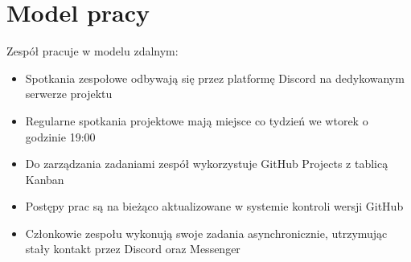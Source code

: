 \documentclass[12pt,a4paper,colorlinks=true,linkcolor=NavyBlue,citecolor=red,urlcolor=NavyBlue]{book}
\begin{document}
\section{Model pracy}
Zespół pracuje w modelu zdalnym:
\begin{itemize}
    \item Spotkania zespołowe odbywają się przez platformę Discord na dedykowanym serwerze projektu
    \item Regularne spotkania projektowe mają miejsce co tydzień we wtorek o godzinie 19:00
    \item Do zarządzania zadaniami zespół wykorzystuje GitHub Projects z tablicą Kanban
    \item Postępy prac są na bieżąco aktualizowane w systemie kontroli wersji GitHub
    \item Członkowie zespołu wykonują swoje zadania asynchronicznie, utrzymując stały kontakt przez Discord oraz Messenger
\end{itemize}
\end{document}
